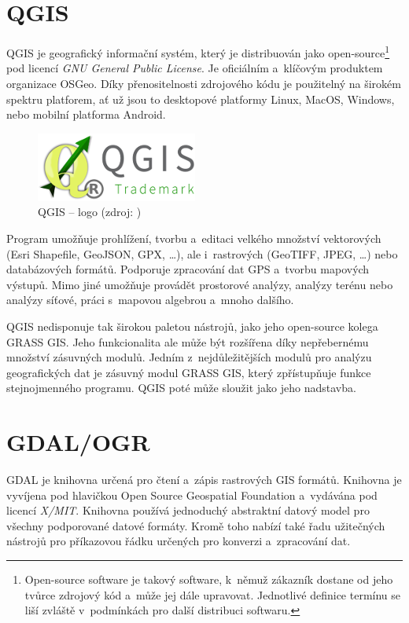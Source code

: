 \documentclass[a4paper,12pt,oneside]{book}
\begin{document}
\section{QGIS}

QGIS je geografický informační systém, který je distribuován jako open-source\footnote{Open-source software je takový software, k~němuž zákazník dostane od jeho tvůrce zdrojový kód a~může jej dále upravovat. Jednotlivé definice termínu  se liší zvláště v~podmínkách pro další distribuci softwaru.\cite{abclinuxu_opensource}} pod licencí \textit{GNU General Public License}. Je oficiálním a~klíčovým produktem organizace OSGeo. Díky přenositelnosti zdrojového kódu je použitelný na širokém spektru platforem, ať už jsou to desktopové platformy Linux, MacOS, Windows, nebo mobilní platforma Android.

\begin{figure}[htb]
\centering
\includegraphics[scale=1]{images/qgis-logo.png}
\caption[QGIS -- logo]{QGIS -- logo (zdroj: \cite{qgis})}
\end{figure}

Program umožňuje prohlížení, tvorbu a~editaci velkého množství vektorových (Esri Shapefile, GeoJSON, GPX, \dots), ale i~rastrových (GeoTIFF, JPEG, \dots) nebo databázových formátů. Podporuje zpracování dat GPS a~tvorbu mapových výstupů. Mimo jiné umožňuje provádět prostorové analýzy, analýzy terénu nebo analýzy síťové, práci s~mapovou algebrou a~mnoho dalšího.

QGIS nedisponuje tak širokou paletou nástrojů, jako jeho open-source kolega GRASS GIS. Jeho funkcionalita ale může být rozšířena díky nepřebernému množství zásuvných modulů. Jedním z~nejdůležitějších modulů pro analýzu geografických dat je zásuvný modul GRASS GIS, který zpřístupňuje funkce stejnojmenného programu. QGIS poté může sloužit jako jeho nadstavba.
\cite{qgis}
\cite{qgis_wiki}


\section{GDAL/OGR}

GDAL je knihovna určená pro čtení a~zápis rastrových GIS formátů. Knihovna je vyvíjena pod hlavičkou Open Source Geospatial Foundation a~vydávána pod licencí \textit{X/MIT}. Knihovna používá jednoduchý abstraktní datový model pro všechny podporované datové formáty. Kromě toho nabízí také řadu užitečných nástrojů pro příkazovou řádku určených pro konverzi a~zpracování dat. \cite{gdal_wiki}
\end{document}
